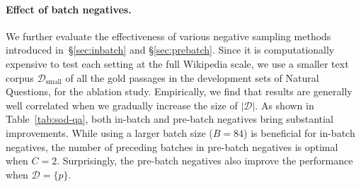 \documentclass[11pt,a4paper]{article}
\newcommand{\cmark}{\ding{51}}\newcommand{\xmark}{\ding{55}}
\newcommand{\ours}{DensePhrases}
\newcommand{\documentset}{\mathcal{D}}
\newcommand{\draftonly}[1]{#1}
\newcommand{\draftcomment}[3]{\draftonly{\textcolor{#2}{{{[#1: #3]}}}}}
\newcommand{\jinhyuk}[1]{\draftcomment{Jinhyuk}{blue}{#1}}
\begin{document}
\begin{comment}
        & & & & & & Gold & 0.05\% & 1\% & 10\% & 100\% \\ \midrule
        \multirow{8}{1.5cm}{Natural Questions} & DenSPI (w/o sparse) & NQ & \xmark & \xmark & \xmark & 68.2 & 35.3 & - & - & - \\
        & DenSPI (w/o sparse) & NQ & \xmark & $b=48$ & \xmark & 68.2 & 54.3 & 35.3 & 31.6 & - \\
        & DenSPI & NQ & \cmark & $b=48$ & \xmark & 68.2 & 58.0 & 44.1 & 38.5 & 26.3 \\
        & \ours & NQ & \xmark & \xmark & \xmark & 70.3 & - & - & - \\
        & \ours & NQ & \xmark & $b=10$ & \xmark & 70.2 & 34.7 & - & - & - \\
        & \ours & NQ & \xmark & $b=84$ & \xmark & 70.5 & 54.9 & - & - \\
        & \ours & NQ & \xmark & $b=84$ & $C=2$ & \textbf{71.7} & \textbf{61.2} & $\geq$ \textbf{44.2} & $\geq$ \textbf{38.6} \\
        & \ours & SQuAD + NQ & \xmark & $b=84$ & $C=2$ & 69.9 & - & - & - \\
        \bottomrule
    \end{tabular}
    }
    \caption{Semi open-domain setting results on the SQuAD and Natural Questions development set. For a better comparison with previous phrase models, we test on SQuAD as well. \jinhyuk{I have to tune in-batch negative size and momentum batch negative size.}\jinhyuk{Numbers for DenSPI are from very old experiment sheets and are overestimated on (slightly easier) sampled questions.}
    \label{tab:sod-qa}}
\end{table*}

\end{comment}
 
\paragraph{Effect of batch negatives.}\label{sec:semi_od}
We further evaluate the effectiveness of various negative sampling methods introduced in~\S\ref{sec:inbatch} and \S\ref{sec:prebatch}.
Since it is computationally expensive to test each setting at the full Wikipedia scale, we use a smaller text corpus $\documentset_\text{small}$ of all the gold passages in the development sets of Natural Questions, for the ablation study.
Empirically, we find that results are generally well correlated when we gradually increase the size of $|\mathcal{D}|$.
As shown in Table~\ref{tab:sod-qa}, both in-batch and pre-batch negatives bring substantial improvements.
While using a larger batch size ($B=84$) is beneficial for in-batch negatives, the number of preceding batches in pre-batch negatives is optimal when $C=2$.
Surprisingly, the pre-batch negatives also improve the performance when $\documentset = \{p\}$.
\end{document}
